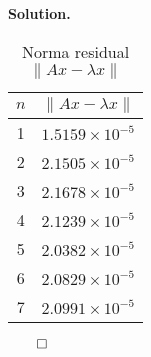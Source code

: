 \documentclass{article}
\theoremstyle{problemstyle}
\newenvironment{solution}{%
  \begin{mdframed}[linewidth=0.8pt,linecolor=Gray,backgroundcolor=Gray!5,roundcorner=5pt]%
  \noindent\textbf{Solution.}%
}{%
\hfill $ \qed $ 
  \end{mdframed}%
}
\begin{document}
\begin{solution}
\begin{enumerate}
		      \begin{table}[H]
			      \centering
			      \begin{tabular}{|c|c|}
				      \hline
				      $n$ & $\lVert Ax - \lambda x \rVert$ \\
				      \hline
				      1   & $1.5159 \times 10^{-5}$        \\
				      \hline
				      2   & $2.1505 \times 10^{-5}$        \\
				      \hline
				      3   & $2.1678 \times 10^{-5}$        \\
				      \hline
				      4   & $2.1239 \times 10^{-5}$        \\
				      \hline
				      5   & $2.0382 \times 10^{-5}$        \\
				      \hline
				      6   & $2.0829 \times 10^{-5}$        \\
				      \hline
				      7   & $2.0991 \times 10^{-5}$        \\
				      \hline
			      \end{tabular}
			      \caption{Norma residual $\lVert Ax - \lambda x \rVert$}
		      \end{table}



\end{enumerate}
\end{solution}
\end{document}
